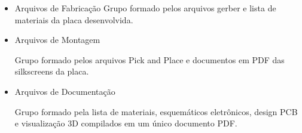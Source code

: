 \begin{itemize}
    \item Arquivos de Fabricação
    Grupo formado pelos arquivos gerber e lista de materiais da placa desenvolvida.
    
    
    
    \item Arquivos de Montagem
    
    Grupo formado pelos arquivos Pick and Place e documentos em PDF das silkscreens da placa.
    
    
    \item Arquivos de Documentação
    
    
    Grupo formado pela lista de materiais, esquemáticos eletrônicos, design PCB e visualização 3D compilados em um único documento PDF.
    

\end{itemize}










